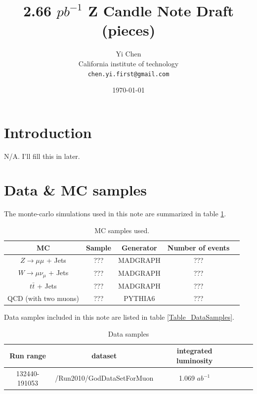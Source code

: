 \documentclass[10pt,a4paper,onecolumn]{article}
\begin{document}
\author{Yi Chen\\
   California institute of technology\\
   \texttt{chen.yi.first@gmail.com}}
\title{2.66 $pb^{-1}$ Z Candle Note Draft (pieces)}
\date{\today}
\maketitle

\tableofcontents
\clearpage 

\section{Introduction}

N/A.  I'll fill this in later.

\section{Data \& MC samples}

The monte-carlo simulations used in this note are summarized in table \ref{Table_MCSamples}.

\begin{table}[h]
   \caption{MC samples used.}
   \centering
   \begin{tabular}{|c|c|c|c|c|}
   \hline
   MC & Sample & Generator & Number of events \\\hline
   $Z\rightarrow\mu\mu$ + Jets & ??? & MADGRAPH & ??? \\\hline
   $W\rightarrow\mu\nu_\mu$ + Jets & ??? & MADGRAPH & ??? \\\hline
   $t\bar{t}$ + Jets & ??? & MADGRAPH & ??? \\\hline
   QCD (with two muons) & ??? & PYTHIA6 & ??? \\\hline
   \end{tabular}
   \label{Table_MCSamples}
\end{table}

Data samples included in this note are listed in table \ref{Table_DataSamples}.

\begin{table}[h]
   \caption{Data samples}
   \centering
   \begin{tabular}{|c|c|c|c|c|c|}
   \hline
   Run range & dataset & integrated luminosity \\\hline
   132440-191053 & /Run2010/GodDataSetForMuon & 1.069 $ab^{-1}$ \\\hline
   \end{tabular}
\end{table}
\end{document}
